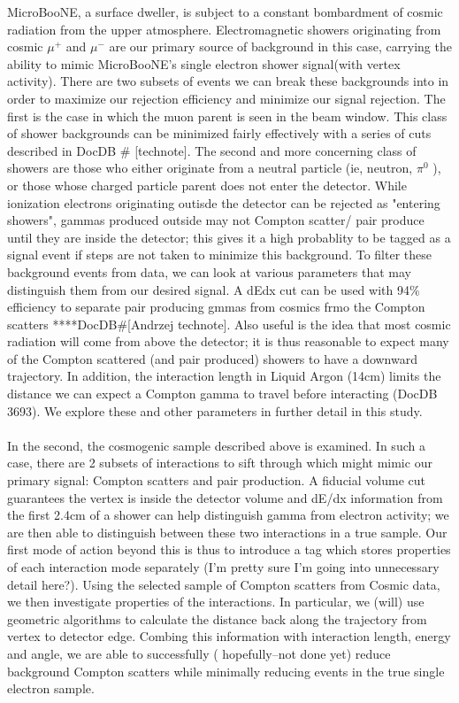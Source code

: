 \documentclass[12pt]{article}
\begin{document}
\par MicroBooNE, a surface dweller, is subject to a constant bombardment of cosmic radiation from the upper atmosphere. Electromagnetic showers originating from cosmic $\mu^+$ and $\mu^-$ are our primary source of background in this case, carrying the ability to mimic MicroBooNE's single electron shower signal(with vertex activity). There are two subsets of events we can break these backgrounds into in order to maximize our rejection efficiency and minimize our signal rejection.  The first is the case in which the muon parent is seen in the beam window. This class of shower backgrounds can be minimized fairly effectively with a series of cuts described in DocDB \# [technote].  The second and more concerning class of showers are those who either originate from a neutral particle (ie, neutron, $\pi^0$ ), or those whose charged particle parent does not enter the detector.  While ionization electrons originating outisde the detector can be rejected as "entering showers", gammas produced outside may not Compton scatter/ pair produce until they are inside the detector; this gives it a high probablity to be tagged as a signal event if steps are not taken to minimize this background. To filter these background events from data, we can look at various parameters that may distinguish them from our desired signal. A dEdx cut can be used with 94\% efficiency to separate pair producing gmmas from cosmics frmo the Compton scatters ****DocDB\#[Andrzej technote]. Also useful is the idea that most cosmic radiation will come from above the detector; it is thus reasonable to expect many of the Compton scattered (and pair produced) showers to have a downward trajectory. In addition, the interaction length in Liquid Argon (14cm) limits the distance we can expect a Compton gamma to travel before interacting (DocDB 3693).   We explore these and other parameters in further detail in this study.
\\ \\  In the second, the cosmogenic sample described above is examined.  In such a case, there are 2 subsets of interactions to sift through which might mimic our primary signal: Compton scatters and pair production.  A fiducial volume cut guarantees the vertex is inside the detector volume and dE/dx information from the first 2.4cm of a shower can help distinguish gamma from electron activity; we are then able to distinguish between these two interactions in a true sample.  Our first mode of action beyond this is thus to introduce a tag which stores properties of each interaction mode separately (I'm pretty sure I'm going into unnecessary detail here?). Using the selected sample of Compton scatters from Cosmic data, we then investigate properties of the interactions.  In particular, we (will) use geometric algorithms to calculate the distance back along the trajectory from vertex to detector edge.  Combing this information with interaction length, energy and angle, we are able to successfully ( hopefully--not done yet) reduce background Compton scatters while minimally reducing events in the true single electron sample. 
\end{document}
